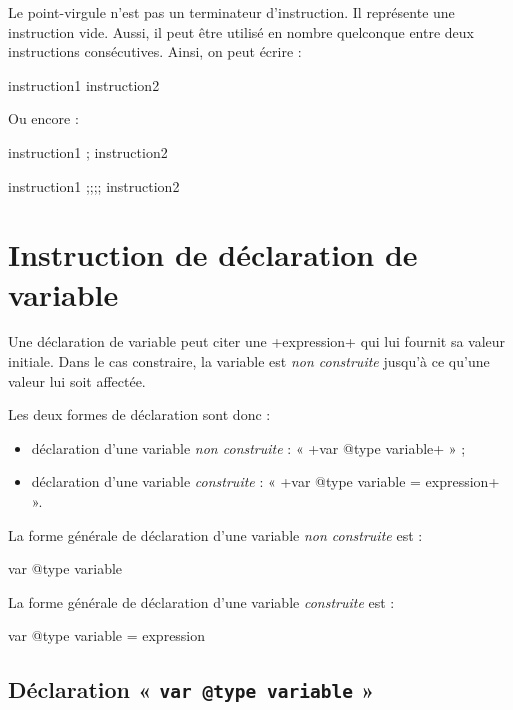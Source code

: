 Le point-virgule n'est pas un terminateur d'instruction. Il représente une instruction vide. Aussi, il peut être utilisé en nombre quelconque entre deux instructions consécutives. Ainsi, on peut écrire :

\begin{galgas}
instruction1  instruction2
\end{galgas}

Ou encore :
\begin{galgas}
instruction1 ; instruction2
\end{galgas}
\begin{galgas}
instruction1 ;;;; instruction2
\end{galgas}







\section{Instruction de déclaration de variable}


Une déclaration de variable peut citer une \ggs+expression+ qui lui fournit sa valeur initiale. Dans le cas constraire, la variable est \emph{non construite} jusqu'à ce qu'une valeur lui soit affectée.

Les deux formes de déclaration sont donc :
\begin{itemize}
\item déclaration d'une variable \emph{non construite} : « \ggs+var @type variable+ » ;
\item déclaration d'une variable \emph{construite} : « \ggs+var @type variable = expression+ ».
\end{itemize}



La forme générale de déclaration d'une variable \emph{non construite} est :
\begin{galgas}
var @type variable
\end{galgas}


La forme générale de déclaration d'une variable \emph{construite} est :
\begin{galgas}
var @type variable = expression
\end{galgas}

\subsection{Déclaration « \texttt{var @type variable} »}


